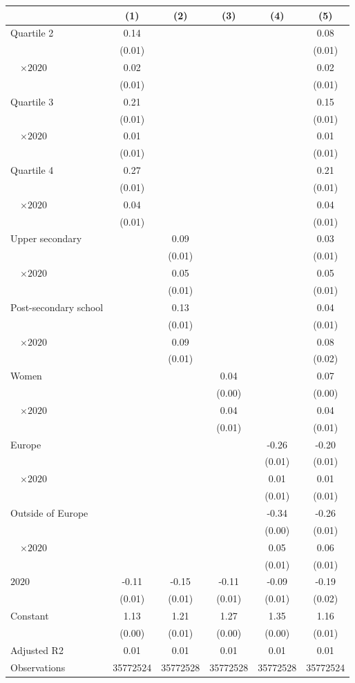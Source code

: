 
\begin{tabular}{@{}l*{5}{S[table-format={-}2.2{\tnote{***}}]}@{}}
\toprule
{} & {(1)} & {(2)} & {(3)} & {(4)} & {(5)}\tabularnewline%
\midrule
Quartile 2 & 0.14\tnote{***} &  &  &  & 0.08\tnote{***}\tabularnewline%
 & (0.01) &  &  &  & \vphantom{5} (0.01)\tabularnewline%
~~\(\times 2020\) & 0.02\tnote{\dagger} &  &  &  & 0.02\tnote{\dagger}\tabularnewline%
 & (0.01) &  &  &  & \vphantom{4} (0.01)\tabularnewline%
Quartile 3 & 0.21\tnote{***} &  &  &  & 0.15\tnote{***}\tabularnewline%
 & (0.01) &  &  &  & \vphantom{3} (0.01)\tabularnewline%
~~\(\times 2020\) & 0.01 &  &  &  & 0.01\tabularnewline%
 & (0.01) &  &  &  & \vphantom{2} (0.01)\tabularnewline%
Quartile 4 & 0.27\tnote{***} &  &  &  & 0.21\tnote{***}\tabularnewline%
 & (0.01) &  &  &  & \vphantom{1} (0.01)\tabularnewline%
~~\(\times 2020\) & 0.04\tnote{**} &  &  &  & 0.04\tnote{**}\tabularnewline%
 & (0.01) &  &  &  & (0.01)\tabularnewline%
Upper secondary &  & 0.09\tnote{***} &  &  & 0.03\tnote{***}\tabularnewline%
 &  & (0.01) &  &  & \vphantom{2} (0.01)\tabularnewline%
~~\(\times 2020\) &  & 0.05\tnote{***} &  &  & 0.05\tnote{***}\tabularnewline%
 &  & (0.01) &  &  & \vphantom{1} (0.01)\tabularnewline%
Post-secondary school &  & 0.13\tnote{***} &  &  & 0.04\tnote{***}\tabularnewline%
 &  & (0.01) &  &  & (0.01)\tabularnewline%
~~\(\times 2020\) &  & 0.09\tnote{***} &  &  & 0.08\tnote{***}\tabularnewline%
 &  & (0.01) &  &  & (0.02)\tabularnewline%
Women &  &  & 0.04\tnote{***} &  & 0.07\tnote{***}\tabularnewline%
 &  &  & (0.00) &  & (0.00)\tabularnewline%
~~\(\times 2020\) &  &  & 0.04\tnote{***} &  & 0.04\tnote{***}\tabularnewline%
 &  &  & (0.01) &  & (0.01)\tabularnewline%
Europe &  &  &  & -0.26\tnote{***} & -0.20\tnote{***}\tabularnewline%
 &  &  &  & (0.01) & \vphantom{2} (0.01)\tabularnewline%
~~\(\times 2020\) &  &  &  & 0.01 & 0.01\tabularnewline%
 &  &  &  & (0.01) & \vphantom{1} (0.01)\tabularnewline%
Outside of Europe &  &  &  & -0.34\tnote{***} & -0.26\tnote{***}\tabularnewline%
 &  &  &  & (0.00) & (0.01)\tabularnewline%
~~\(\times 2020\) &  &  &  & 0.05\tnote{***} & 0.06\tnote{***}\tabularnewline%
 &  &  &  & (0.01) & (0.01)\tabularnewline%
\midrule
\(2020\) & -0.11\tnote{***} & -0.15\tnote{***} & -0.11\tnote{***} & -0.09\tnote{***} & -0.19\tnote{***}\tabularnewline%
 & (0.01) & (0.01) & (0.01) & (0.01) & (0.02)\tabularnewline%
Constant & 1.13\tnote{***} & 1.21\tnote{***} & 1.27\tnote{***} & 1.35\tnote{***} & 1.16\tnote{***}\tabularnewline%
 & (0.00) & (0.01) & (0.00) & (0.00) & (0.01)\tabularnewline%
\midrule
Adjusted R2 & 0.01 & 0.01 & 0.01 & 0.01 & 0.01\tabularnewline%
Observations & {\num{35772524}} & {\num{35772528}} & {\num{35772528}} & {\num{35772528}} & {\num{35772524}}\tabularnewline%
\bottomrule
\end{tabular}
